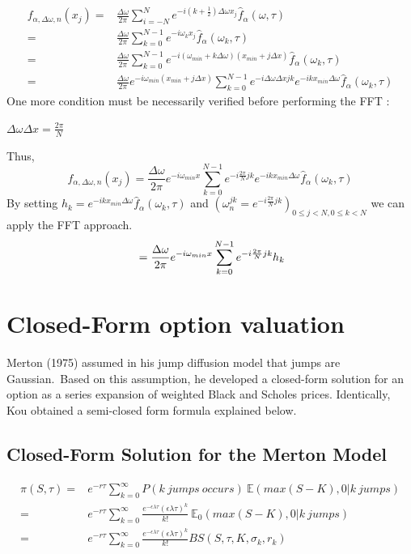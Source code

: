 \documentclass[12pt]{report}
\begin{document}
\begin{align}
f_{\alpha,\Delta \omega, n}(x_j)=&\frac{\Delta \omega}{2\pi} \sum \limits_{i=-N}^N e^{-i(k+\frac{1}{2} ) \Delta \omega x_j }\hat{f}_{\alpha}(\omega,\tau) \nonumber
\\=& \frac{\Delta \omega}{2\pi} \sum \limits_{k=0}^{N-1} e^{-i \omega_k x_j }\hat{f}_{\alpha}(\omega_k,\tau) \nonumber
\\=& \frac{\Delta \omega}{2\pi} \sum \limits_{k=0}^{N-1} e^{-i (\omega_{min}+k\Delta \omega )  (x_{min}+j\Delta x) }\hat{f}_{\alpha}(\omega_k,\tau) \nonumber
\\=&\frac{\Delta \omega}{2\pi}
\label{fret}e^{-i \omega_{min} (x_{min}+j\Delta x) } \sum \limits_{k=0}^{N-1} e^{-i\Delta \omega \Delta x j k} e^{-i k x_{min} \Delta \omega}\hat{f}_{\alpha}(\omega_k,\tau) \nonumber
\end{align}
One more condition must be necessarily verified before performing the FFT :
\begin{center}
$\Delta \omega \Delta x = \frac{2 \pi}{N}$
\end{center} 
Thus, \\
\begin{equation*}
f_{\alpha,\Delta \omega, n}(x_j)=\frac{\Delta \omega}{2\pi} e^{-i \omega_{min} x} \sum \limits_{k=0}^{N-1} e^{-i\frac{2 \pi}{N}j k} e^{-i k x_{min} \Delta \omega}\hat{f}_{\alpha}(\omega_k,\tau) 
\end{equation*}
By setting $h_k=  e^{-i k x_{min} \Delta \omega } \hat{f}_{\alpha}(\omega_k,\tau)$ and $(\omega_n^{j k}= e^{-i \frac{2\pi}{N}j k })_{0 \le j<N , 0 \le k<N}$ we can apply the FFT approach.
\begin{equation}
\\=\frac{\Delta \omega}{2\pi} e^{-i \omega_{min} x} \sum \limits_{k=0}^{N-1} e^{-i\frac{2 \pi}{N}j k} h_k
\label{4.14}
\end{equation}
\section{Closed-Form option valuation}
Merton (1975) assumed in his jump diffusion model that jumps are
Gaussian.~Based on this assumption, he developed a closed-form solution for an option as a series expansion of weighted Black and  Scholes prices. Identically, Kou obtained a semi-closed form formula explained below.
\subsection{Closed-Form Solution for the Merton Model}
\begin{align*}
\pi(S,\tau)=& e^{-r\tau} \sum \limits_{k=0}^{\infty} P(k~jumps~occurs)~\mathbb{E}(max(S-K),0|k~jumps)\\
=& e^{-r\tau} \sum \limits_{k=0}^{\infty} \frac{e^{-\epsilon \lambda \tau}(\epsilon \lambda \tau)^k}{k!} ~ \mathbb{E}_0(max(S-K),0|k~jumps)\\
=& e^{-r\tau} \sum \limits_{k=0}^{\infty} \frac{e^{-\epsilon \lambda \tau}(\epsilon \lambda \tau)^k}{k!} BS(S,\tau,K,\sigma_k,r_k)
\end{align*}
\end{document}
